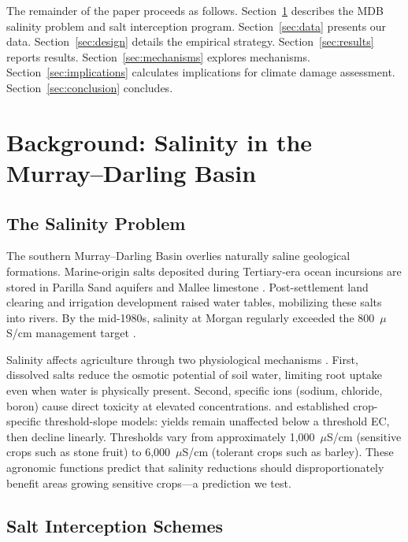 \documentclass[12pt]{article}
\begin{document}
The remainder of the paper proceeds as follows. Section~\ref{sec:background} describes the MDB salinity problem and salt interception program. Section~\ref{sec:data} presents our data. Section~\ref{sec:design} details the empirical strategy. Section~\ref{sec:results} reports results. Section~\ref{sec:mechanisms} explores mechanisms. Section~\ref{sec:implications} calculates implications for climate damage assessment. Section~\ref{sec:conclusion} concludes.


\section{Background: Salinity in the Murray--Darling Basin}\label{sec:background}

\subsection{The Salinity Problem}

The southern Murray--Darling Basin overlies naturally saline geological formations. Marine-origin salts deposited during Tertiary-era ocean incursions are stored in Parilla Sand aquifers and Mallee limestone \citep{nsw2009salinityaudit}. Post-settlement land clearing and irrigation development raised water tables, mobilizing these salts into rivers. By the mid-1980s, salinity at Morgan regularly exceeded the 800~$\mu$S/cm management target \citep{hart2020salinity}.

Salinity affects agriculture through two physiological mechanisms \citep{munns2008mechanisms}. First, dissolved salts reduce the osmotic potential of soil water, limiting root uptake even when water is physically present. Second, specific ions (sodium, chloride, boron) cause direct toxicity at elevated concentrations. \citet{maas1977salt} and \citet{ayers1985water} established crop-specific threshold-slope models: yields remain unaffected below a threshold EC, then decline linearly. Thresholds vary from approximately 1,000~$\mu$S/cm (sensitive crops such as stone fruit) to 6,000~$\mu$S/cm (tolerant crops such as barley). These agronomic functions predict that salinity reductions should disproportionately benefit areas growing sensitive crops---a prediction we test.

\subsection{Salt Interception Schemes}
\end{document}
